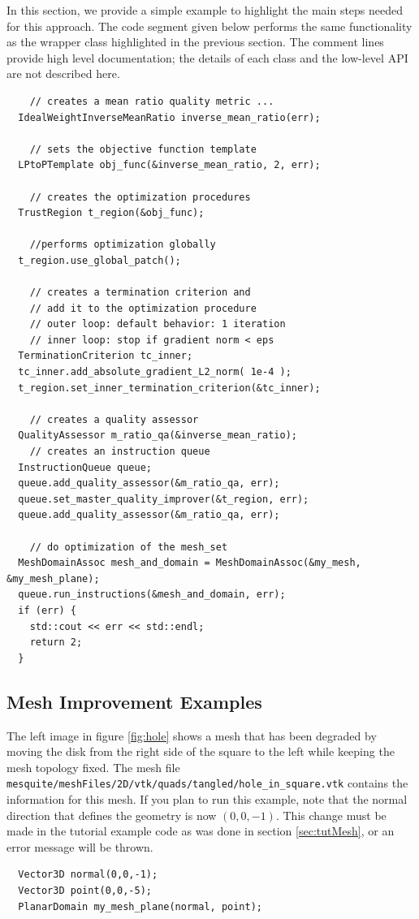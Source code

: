 In this section, we provide a simple example to highlight the main
steps needed for this approach.  The code segment given below performs
the same functionality as the wrapper class highlighted in the
previous section.  The comment lines provide high level documentation;
the details of each class and the low-level API are not described here.

\begin{verbatim}
    // creates a mean ratio quality metric ...
  IdealWeightInverseMeanRatio inverse_mean_ratio(err);

    // sets the objective function template
  LPtoPTemplate obj_func(&inverse_mean_ratio, 2, err);
  
    // creates the optimization procedures
  TrustRegion t_region(&obj_func);

    //performs optimization globally
  t_region.use_global_patch(); 

    // creates a termination criterion and 
    // add it to the optimization procedure
    // outer loop: default behavior: 1 iteration
    // inner loop: stop if gradient norm < eps
  TerminationCriterion tc_inner;
  tc_inner.add_absolute_gradient_L2_norm( 1e-4 ); 
  t_region.set_inner_termination_criterion(&tc_inner);

    // creates a quality assessor
  QualityAssessor m_ratio_qa(&inverse_mean_ratio);
    // creates an instruction queue
  InstructionQueue queue;
  queue.add_quality_assessor(&m_ratio_qa, err); 
  queue.set_master_quality_improver(&t_region, err); 
  queue.add_quality_assessor(&m_ratio_qa, err); 

    // do optimization of the mesh_set
  MeshDomainAssoc mesh_and_domain = MeshDomainAssoc(&my_mesh, &my_mesh_plane);
  queue.run_instructions(&mesh_and_domain, err);
  if (err) {
    std::cout << err << std::endl;
    return 2;
  }
\end{verbatim} 

\newpage

\subsection{Mesh Improvement Examples}

The left image in figure \ref{fig:hole} shows a mesh that has
been degraded by moving the disk from the right side of the square to
the left while keeping the mesh topology fixed.
The mesh file
\newline
\texttt{mesquite/meshFiles/2D/vtk/quads/tangled/hole\_in\_square.vtk} contains the
information for this mesh.  If you plan to run this example, note that
the normal direction that defines the geometry is now $(0,0,-1)$.
This change must be made in the tutorial example code
as was done in section \ref{sec:tutMesh}, or an error message will be
thrown.
\begin{verbatim}
  Vector3D normal(0,0,-1);
  Vector3D point(0,0,-5);
  PlanarDomain my_mesh_plane(normal, point);
\end{verbatim}

